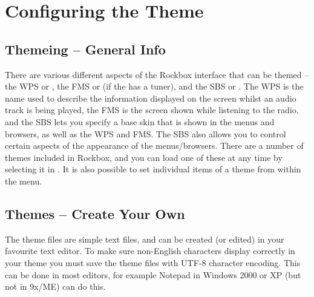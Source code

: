 
\section{\label{ref:ConfiguringtheWPS}Configuring the Theme}

\subsection{Themeing -- General Info}

  There are various different aspects of the Rockbox interface
  that can be themed -- the WPS or , the FMS or
   (if the \dap{} has a tuner), and the SBS or
  . The WPS is the name used to
  describe the information displayed on the \daps{} screen whilst an audio
  track is being played, the FMS is the screen shown while listening to the
  radio, and the SBS lets you specify a base skin that is shown in the
  menus and browsers, as well as the WPS and FMS. The SBS also allows you to
  control certain aspects of the appearance of the menus/browsers.
  There are a number of themes included in Rockbox, and
  you can load one of these at any time by selecting it in
  .
  It is also possible to set individual items of a theme from within the
   menu.


\subsection{\label{ref:CreateYourOwnWPS}Themes -- Create Your Own}
The theme files are simple text files, and can be created (or edited) in your
favourite text editor. To make sure non-English characters
display correctly in your theme you must save the theme files with UTF-8
character encoding. This can be done in most editors, for example Notepad in
Windows 2000 or XP (but not in 9x/ME) can do this.

